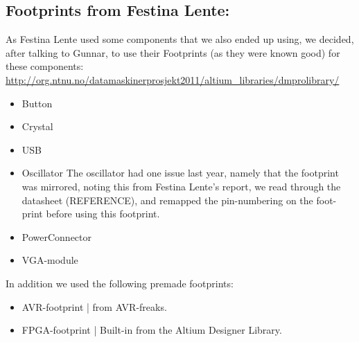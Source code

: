 \subsection{Footprints from Festina Lente:}
As Festina Lente used some components that we also ended up using, we decided,
after talking to Gunnar, to use
their Footprints (as they were known good) for these components:
\url{http://org.ntnu.no/datamaskinerprosjekt2011/altium_libraries/dmprolibrary/}
\begin{itemize}
\item Button
\item Crystal
\item USB
\item Oscillator The oscillator had one issue last year, namely that the
  footprint was mirrored, noting this from Festina Lente's report, we read
  through the datasheet (REFERENCE), and remapped the
  pin-numbering on the foot-print before using this footprint.
\item PowerConnector
\item VGA-module
\end{itemize}

In addition we used the following premade footprints:
\begin{itemize}
\item AVR-footprint | from AVR-freaks.
\item FPGA-footprint | Built-in from the Altium Designer Library.
\end{itemize}

